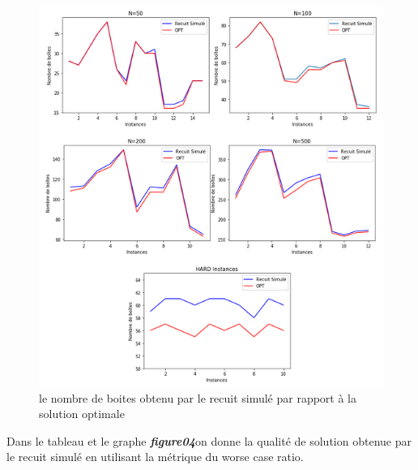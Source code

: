 \documentclass[12pt]{article}
\begin{document}
\begin{figure}[H]
    \centering
    \includegraphics[width=\linewidth, scale=1.3]{../figures/RS/rs figures.PNG}
    \caption{le nombre de boites obtenu par le recuit simulé par rapport à la solution optimale}
\end{figure}
Dans le tableau et le graphe \textbf{\emph{figure04}}on donne la qualité de solution obtenue par le recuit simulé en utilisant la métrique du worse case ratio.
\end{document}
